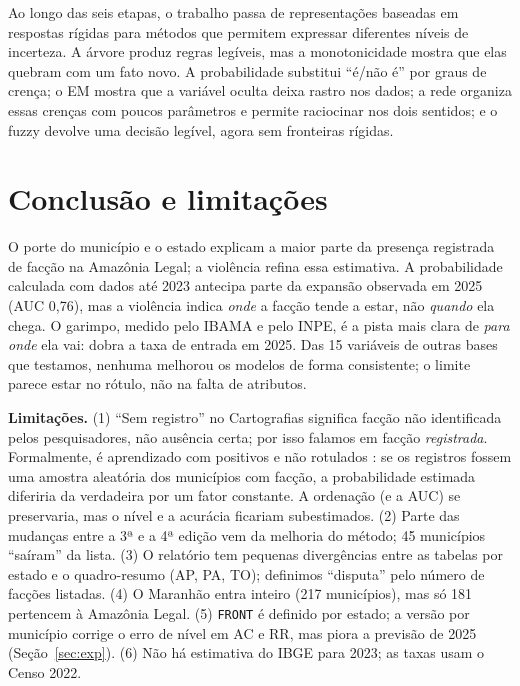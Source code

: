 \documentclass[10pt,a4paper,twocolumn]{article}
\begin{document}
Ao longo das seis etapas, o trabalho passa de representações baseadas em respostas rígidas para métodos que permitem expressar diferentes níveis de incerteza. A árvore produz regras
legíveis, mas a monotonicidade mostra que elas quebram com um fato novo. A probabilidade substitui
``é/não é'' por graus de crença; o EM mostra que a variável oculta deixa rastro nos dados; a rede
organiza essas crenças com poucos parâmetros e permite raciocinar nos dois sentidos; e o fuzzy
devolve uma decisão legível, agora sem fronteiras rígidas.

\section{Conclusão e limitações}\label{sec:concl}
O porte do município e o estado explicam a maior parte da presença registrada de facção na
Amazônia Legal; a violência refina essa estimativa. A probabilidade calculada com dados até 2023
antecipa parte da expansão observada em 2025 (AUC 0,76), mas a violência indica \emph{onde} a facção
tende a estar, não \emph{quando} ela chega. O garimpo, medido pelo IBAMA e pelo INPE, é a pista mais
clara de \emph{para onde} ela vai: dobra a taxa de entrada em 2025. Das 15 variáveis de outras bases
que testamos, nenhuma melhorou os modelos de forma consistente; o limite parece estar no rótulo,
não na falta de atributos.

\textbf{Limitações.} (1) ``Sem registro'' no Cartografias significa facção não identificada pelos
pesquisadores, não ausência certa; por isso falamos em facção \emph{registrada}. Formalmente, é
aprendizado com positivos e não rotulados \cite{elkan}: se os registros fossem uma amostra
aleatória dos municípios com facção, a probabilidade estimada diferiria da verdadeira por um fator
constante. A ordenação (e a AUC) se preservaria, mas o nível e a acurácia ficariam subestimados. (2) Parte das
mudanças entre a 3ª e a 4ª edição vem da melhoria do método; 45 municípios ``saíram'' da lista.
(3) O relatório tem pequenas divergências entre as tabelas por estado e o quadro-resumo (AP, PA,
TO); definimos ``disputa'' pelo número de facções listadas. (4) O Maranhão entra inteiro (217
municípios), mas só 181 pertencem à Amazônia Legal. (5) \texttt{FRONT} é definido por estado; a versão por município corrige o erro de nível em AC e RR,
mas piora a previsão de 2025 (Seção~\ref{sec:exp}).
(6) Não há estimativa do IBGE para 2023; as taxas usam o Censo 2022.
\end{document}
